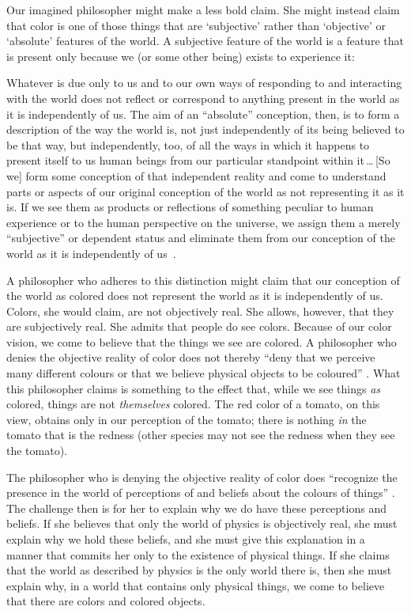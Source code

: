 \documentclass[11pt]{article}
\newenvironment{squote}{%
	\begin{spacing}{1}
	\begin{list}{}{%
	\setlength{\labelwidth}{0pt}%
	\rightmargin\leftmargin%
	}
	\item\relax
	}{%
	\end{list}%
	\end{spacing}
	}
\begin{document}
\begin{spacing}{1.5}
Our imagined philosopher might make a less bold claim.  She might
instead claim that color is one of those things that are `subjective'
rather than `objective' or `absolute' features of the world.  A
subjective feature of the world is a feature that is present only
because we (or some other being) exists to experience it:

\begin{squote}
Whatever is due only to us and to our own ways of responding to and
interacting with the world does not reflect or correspond to anything
present in the world as it is independently of us.  The aim of an
``absolute'' conception, then, is to form a description of the way the
world is, not just independently of its being believed to be that way,
but independently, too, of all the ways in which it happens to present
itself to us human beings from our particular standpoint within
it\,\ldots\,[So we] form some conception of that independent reality
and come to understand parts or aspects of our original conception of
the world as not representing it as it is.  If we see them as products
or reflections of something peculiar to human experience or to the
human perspective on the universe, we assign them a merely
``subjective'' or dependent status and eliminate them from our
conception of the world as it is independently of
us~\citep[30--31]{stroud2000a}.
\end{squote}

A philosopher who adheres to this distinction might claim that our
conception of the world as colored does not represent the world as it
is independently of us.  Colors, she would claim, are not objectively
real.  She allows, however, that they are subjectively real.  She
admits that people do see colors.  Because of our color vision, we
come to believe that the things we see are colored.  A philosopher who
denies the objective reality of color does not thereby ``deny that we
perceive many different colours or that we believe physical objects to
be coloured'' \citep[145]{stroud2000a}.  What this philosopher claims
is something to the effect that, while we see things {\em as} colored,
things are not {\em themselves} colored.  The red color of a tomato,
on this view, obtains only in our perception of the tomato; there is
nothing {\em in} the tomato that is the redness (other species may not
see the redness when they see the tomato).

The philosopher who is denying the objective reality of color does
``recognize the presence in the world of perceptions of and beliefs
about the colours of things'' \citep[199]{stroud2000a}.  The challenge
then is for her to explain why we do have these perceptions and
beliefs.  If she believes that only the world of physics is
objectively real, she must explain why we hold these beliefs, and she
must give this explanation in a manner that commits her only to the
existence of physical things.  If she claims that the world as
described by physics is the only world there is, then she must explain
why, in a world that contains only physical things, we come to believe
that there are colors and colored objects.


\end{spacing}
\end{document}
